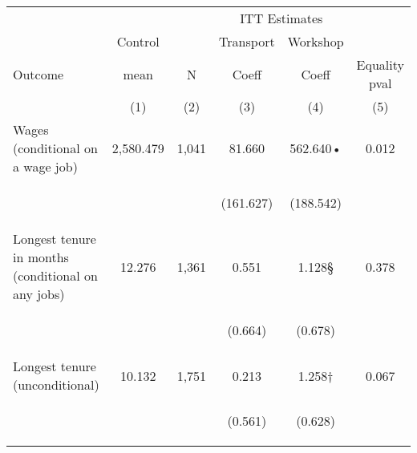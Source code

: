 \begin{tabular}{lccccc}
\hline \noalign{\smallskip} &  &  & \multicolumn{2}{c}{{ITT Estimates}} & \\
 & Control &  & {Transport} & {Workshop} & \\
Outcome & mean & N & Coeff & Coeff & Equality pval\\
 & (1) & (2) & (3) & (4) & (5)\\
\noalign{\smallskip}\hline \noalign{\smallskip}Wages (conditional on a wage job) & 2,580.479 & 1,041 & 81.660 & 562.640• & 0.012\\
 & \begin{footnotesize}\end{footnotesize} & \begin{footnotesize}\end{footnotesize} & \begin{footnotesize}(161.627)\end{footnotesize} & \begin{footnotesize}(188.542)\end{footnotesize} & \begin{footnotesize}\end{footnotesize}\\
\noalign{\smallskip}Longest tenure in months (conditional on any jobs)  & 12.276 & 1,361 & 0.551 & 1.128§ & 0.378\\
 & \begin{footnotesize}\end{footnotesize} & \begin{footnotesize}\end{footnotesize} & \begin{footnotesize}(0.664)\end{footnotesize} & \begin{footnotesize}(0.678)\end{footnotesize} & \begin{footnotesize}\end{footnotesize}\\
\noalign{\smallskip}Longest tenure (unconditional) & 10.132 & 1,751 & 0.213 & 1.258† & 0.067\\
 & \begin{footnotesize}\end{footnotesize} & \begin{footnotesize}\end{footnotesize} & \begin{footnotesize}(0.561)\end{footnotesize} & \begin{footnotesize}(0.628)\end{footnotesize} & \begin{footnotesize}\end{footnotesize}\\

\end{tabular}
